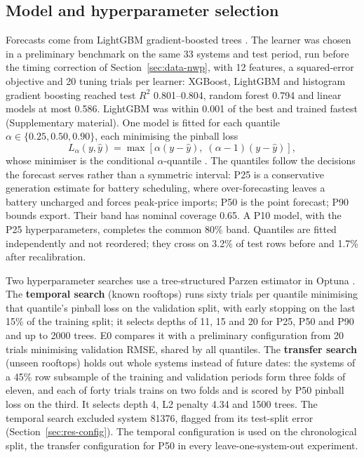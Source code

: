 \subsection{Model and hyperparameter selection}
\label{sec:meth-model}

Forecasts come from LightGBM gradient-boosted trees \citep{Ke2017,Friedman2001}. The learner was chosen in a preliminary benchmark on the same 33 systems and test period, run before the timing correction of Section~\ref{sec:data-nwp}, with 12 features, a squared-error objective and 20 tuning trials per learner: XGBoost, LightGBM and histogram gradient boosting reached test $R^2$ 0.801--0.804, random forest 0.794 and linear models at most 0.586. LightGBM was within 0.001 of the best and trained fastest (Supplementary material). One model is fitted for each quantile $\alpha \in \{0.25, 0.50, 0.90\}$, each minimising the pinball loss
\begin{equation}
L_\alpha(y, \hat{y}) = \max\left[\alpha (y - \hat{y}),\; (\alpha - 1)(y - \hat{y})\right],
\end{equation}
whose minimiser is the conditional $\alpha$-quantile \citep{Koenker1978}. The quantiles follow the decisions the forecast serves rather than a symmetric interval: P25 is a conservative generation estimate for battery scheduling, where over-forecasting leaves a battery uncharged and forces peak-price imports; P50 is the point forecast; P90 bounds export. Their band has nominal coverage 0.65. A P10 model, with the P25 hyperparameters, completes the common 80\% band. Quantiles are fitted independently and not reordered; they cross on 3.2\% of test rows before and 1.7\% after recalibration.

Two hyperparameter searches use a tree-structured Parzen estimator in Optuna \citep{Akiba2019}. The \textbf{temporal search} (known rooftops) runs sixty trials per quantile minimising that quantile's pinball loss on the validation split, with early stopping on the last 15\% of the training split; it selects depths of 11, 15 and 20 for P25, P50 and P90 and up to 2000 trees. E0 compares it with a preliminary configuration from 20 trials minimising validation RMSE, shared by all quantiles. The \textbf{transfer search} (unseen rooftops) holds out whole systems instead of future dates: the systems of a 45\% row subsample of the training and validation periods form three folds of eleven, and each of forty trials trains on two folds and is scored by P50 pinball loss on the third. It selects depth 4, L2 penalty 4.34 and 1500 trees. The temporal search excluded system 81376, flagged from its test-split error (Section~\ref{sec:res-config}). The temporal configuration is used on the chronological split, the transfer configuration for P50 in every leave-one-system-out experiment.

